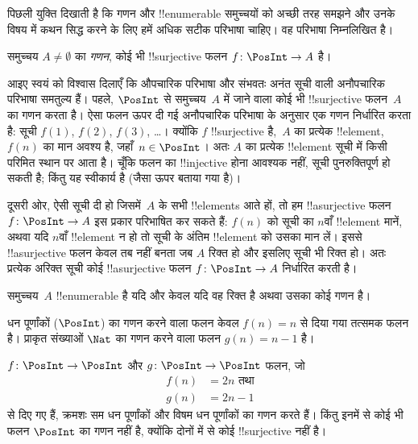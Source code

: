 \documentclass[../../../include/open-logic-section]{subfiles}
\begin{document}
पिछली युक्ति दिखाती है कि गणन और !!{enumerable} समुच्चयों को अच्छी तरह समझने
और उनके विषय में कथन सिद्ध करने के लिए हमें अधिक सटीक परिभाषा चाहिए। वह
परिभाषा निम्नलिखित है।

\begin{defn} 
समुच्चय $A \neq \emptyset$ का \emph{गणन}, कोई भी !!{surjective} फलन
$f \colon \PosInt \to A$ है।
\end{defn}

\begin{explain}
आइए स्वयं को विश्वास दिलाएँ कि औपचारिक परिभाषा और संभवतः अनंत सूची वाली
अनौपचारिक परिभाषा समतुल्य हैं। पहले, $\PosInt$ से समुच्चय~$A$ में जाने वाला
कोई भी !!{surjective} फलन~$A$ का गणन करता है। ऐसा फलन ऊपर दी गई अनौपचारिक
परिभाषा के अनुसार एक गणन निर्धारित करता है: सूची $f(1)$, $f(2)$, $f(3)$,
\dots। क्योंकि $f$ !!{surjective} है,~$A$ का प्रत्येक !!{element},~$f(n)$
का मान अवश्य है, जहाँ~$n \in \PosInt$। अतः $A$ का प्रत्येक
!!{element} सूची में किसी परिमित स्थान पर आता है। चूँकि फलन का
!!{injective} होना आवश्यक नहीं, सूची पुनरुक्तिपूर्ण हो सकती है; किंतु यह
स्वीकार्य है (जैसा ऊपर बताया गया है)।

दूसरी ओर, ऐसी सूची दी हो जिसमें~$A$ के सभी !!{element}s आते हों, तो हम
!!a{surjective} फलन $f\colon \PosInt \to A$ इस प्रकार परिभाषित कर सकते हैं:
$f(n)$ को सूची का $n$वाँ !!{element} मानें, अथवा यदि $n$वाँ !!{element} न
हो तो सूची के अंतिम !!{element} को उसका मान लें। इससे !!a{surjective} फलन
केवल तब नहीं बनता जब $A$ रिक्त हो और इसलिए सूची भी रिक्त हो। अतः प्रत्येक
अरिक्त सूची कोई !!a{surjective} फलन $f\colon \PosInt \to A$ निर्धारित
करती है।
\end{explain}

\begin{defn}
  समुच्चय~$A$ !!{enumerable} है यदि और केवल यदि वह रिक्त है अथवा उसका कोई
  गणन है।
\end{defn}

\begin{ex}
धन पूर्णांकों ($\PosInt$) का गणन करने वाला फलन केवल $f(n) = n$ से दिया गया
तत्समक फलन है। प्राकृत संख्याओं $\Nat$ का गणन करने वाला फलन
$g(n) = n - 1$ है।
\end{ex}

\begin{ex}
$f\colon \PosInt \to \PosInt$ और $g \colon \PosInt \to
\PosInt$ फलन, जो
\begin{align*}
f(n) & = 2n \text{ तथा}\\
g(n) & = 2n - 1
\end{align*}
से दिए गए हैं, क्रमशः सम धन पूर्णांकों और विषम धन पूर्णांकों का गणन करते
हैं। किंतु इनमें से कोई भी फलन $\PosInt$ का गणन नहीं है, क्योंकि दोनों में
से कोई !!{surjective} नहीं है।
\end{ex}
\end{document}
